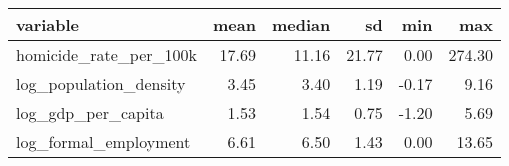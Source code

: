 \begin{tabular}{lrrrrr}
  \toprule
variable & mean & median & sd & min & max \\ 
  \midrule
homicide\_rate\_per\_100k & 17.69 & 11.16 & 21.77 & 0.00 & 274.30 \\ 
  log\_population\_density & 3.45 & 3.40 & 1.19 & -0.17 & 9.16 \\ 
  log\_gdp\_per\_capita & 1.53 & 1.54 & 0.75 & -1.20 & 5.69 \\ 
  log\_formal\_employment & 6.61 & 6.50 & 1.43 & 0.00 & 13.65 \\ 
   \bottomrule
\end{tabular}
